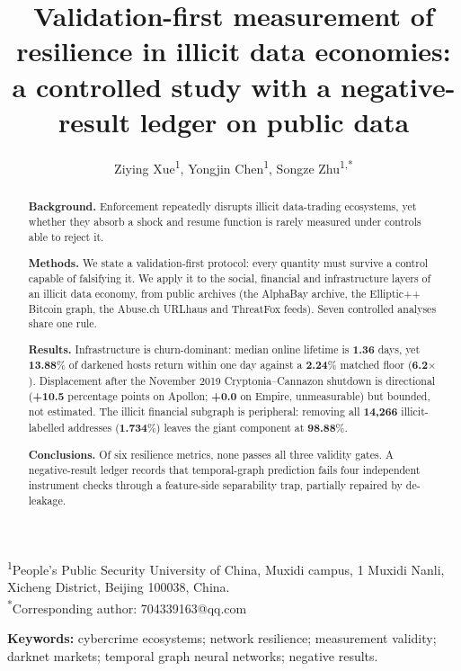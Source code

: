 \documentclass[10pt,a4paper]{article}
\title{\bfseries Validation-first measurement of resilience in illicit data
economies: a controlled study with a negative-result ledger on public data}
\author{Ziying Xue\textsuperscript{1}, Yongjin Chen\textsuperscript{1},
Songze Zhu\textsuperscript{1,*}}
\date{}
\begin{document}
\maketitle
\thispagestyle{empty}

\noindent\textsuperscript{1}People's Public Security University of China,
Muxidi campus, 1 Muxidi Nanli, Xicheng District, Beijing 100038, China.\\
\noindent\textsuperscript{*}Corresponding author: 704339163@qq.com

\vspace{6pt}

\begin{abstract}
\noindent\textbf{Background.} Enforcement repeatedly disrupts illicit
data-trading ecosystems, yet whether they absorb a shock and resume function is
rarely measured under controls able to reject it.

\noindent\textbf{Methods.} We state a validation-first protocol: every quantity
must survive a control capable of falsifying it. We apply it to the social,
financial and infrastructure layers of an illicit data economy, from public
archives (the AlphaBay archive, the Elliptic++ Bitcoin graph, the Abuse.ch
URLhaus and ThreatFox feeds). Seven controlled analyses share one rule.

\noindent\textbf{Results.} Infrastructure is churn-dominant: median online
lifetime is \textbf{1.36} days, yet \textbf{13.88}\% of darkened hosts return
within one day against a \textbf{2.24}\% matched floor (\textbf{6.2}$\times$).
Displacement after the November 2019 Cryptonia--Cannazon shutdown is directional
(\textbf{+10.5} percentage points on Apollon; \textbf{+0.0} on Empire,
unmeasurable) but bounded, not estimated. The illicit financial subgraph is
peripheral: removing all \textbf{14,266} illicit-labelled addresses
(\textbf{1.734}\%) leaves the giant component at \textbf{98.88}\%.

\noindent\textbf{Conclusions.} Of six resilience metrics, none passes all three
validity gates. A negative-result ledger records that temporal-graph prediction
fails four independent instrument checks through a feature-side separability
trap, partially repaired by de-leakage.
\end{abstract}

\vspace{2pt}
\noindent\textbf{Keywords:} cybercrime ecosystems; network resilience;
measurement validity; darknet markets; temporal graph neural networks;
negative results.
\end{document}
